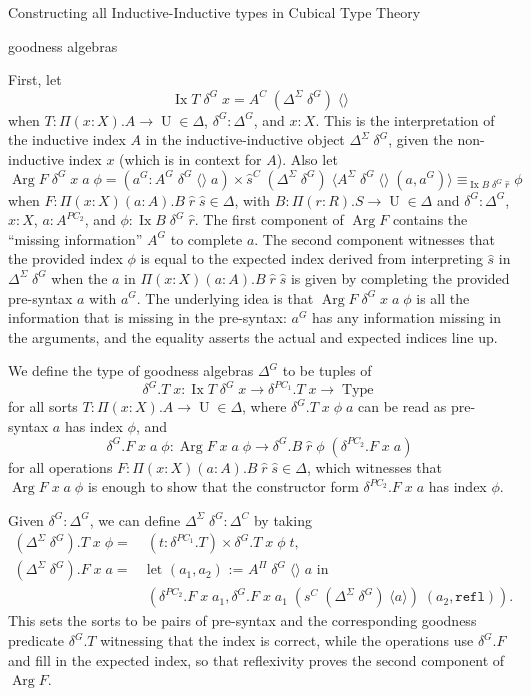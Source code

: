 \documentclass[runningheads]{llncs}
\DeclareMathOperator{\USet}{Type}
\DeclareMathOperator{\UU}{U}
\DeclareMathOperator{\Arg}{Arg}
\DeclareMathOperator{\Ix}{Ix}
\newcommand{\IdA}[3]{{#1}\equiv_{#3}{#2}}
\newcommand{\refl}{\texttt{refl}}
\def\emptytuple{\langle\rangle}
\begin{document}
{\begin{section}{Constructing all Inductive-Inductive types in Cubical Type Theory}
\begin{subsection}{goodness algebras}
\begin{definition}
First, let \[\Ix T\;\delta^G\;x = A^C\;(\Delta^{\Sigma}\;\delta^G)\;\emptytuple\] when $T : \Pi(x : X).A \to \UU \in \Delta$, $\delta^G : \Delta^G$, and $x : X$. This is the interpretation of the inductive index $A$ in the inductive-inductive object $\Delta^\Sigma\;\delta^G$, given the non-inductive index $x$ (which is in context for $A$).
Also let \[\Arg F\;\delta^G\;x\;a\;\phi = (a^G : A^G\;\delta^G\;\emptytuple\;a)\times\IdA{\hat{s}^C\;(\Delta^{\Sigma}\;\delta^G)\;\langle A^{\Sigma}\;\delta^G\;\emptytuple\;(a,a^G)\rangle}{\phi}{\Ix B\;\delta^G\;\hat{r}}\] when $F : \Pi(x : X)(a:A).B\;\hat{r}\;\hat{s} \in \Delta$, with $B : \Pi(r : R).S\to\UU\in\Delta$ and $\delta^G : \Delta^G$, $x : X$, $a : A^{PC_2}$, and $\phi : \Ix B\;\delta^G\;\hat{r}$. The first component of $\Arg F$ contains the ``missing information'' $A^G$ to complete $a$. The second component witnesses that the provided index $\phi$ is equal to the expected index derived from interpreting $\hat{s}$ in $\Delta^\Sigma\;\delta^G$ when the $a$ in $\Pi(x : X)(a : A).B\;\hat{r}\;\hat{s}$ is given by completing the provided pre-syntax $a$ with $a^G$. The underlying idea is that $\Arg F\;\delta^G\;x\;a\;\phi$ is all the information that is missing in the pre-syntax: $a^G$ has any information missing in the arguments, and the equality asserts the actual and expected indices line up.

We define the type of goodness algebras $\Delta^G$ to be tuples of \[\delta^G.T\;x : \Ix T\;\delta^G\;x \to \delta^{PC_1}.T\;x \to \USet\] for all sorts $T : \Pi(x : X).A \to \UU \in \Delta$, where $\delta^G.T\;x\;\phi\;a$ can be read as pre-syntax $a$ has index $\phi$, and
\[\delta^G.F\;x\;a\;\phi : \Arg F\;x\;a\;\phi \to \delta^G.B\;\hat{r}\;\phi\;(\delta^{PC_2}.F\;x\;a)\] for all operations $F : \Pi(x : X)(a : A).B\;\hat{r}\;\hat{s} \in \Delta$, which witnesses that $\Arg F\;x\;a\;\phi$ is enough to show that the constructor form $\delta^{PC_2}.F\;x\;a$ has index $\phi$.

Given $\delta^G : \Delta^G$, we can define $\Delta^\Sigma\;\delta^G : \Delta^C$ by taking \begin{align*}(\Delta^\Sigma\;\delta^G).T\;x\;\phi =&\; (t : \delta^{PC_1}.T)\times \delta^G.T\;x\;\phi\;t,\\
(\Delta^\Sigma\;\delta^G).F\;x\;a =&\; \text{let $(a_1,a_2)$ := $A^{\Pi}\;\delta^G\;\emptytuple\;a$ in}\\&\;(\delta^{PC_2}.F\;x\;a_1, \delta^G.F\;x\;a_1\;(s^C\;(\Delta^\Sigma\;\delta^G)\;\langle a\rangle)\;(a_2,\refl)).\end{align*}
This sets the sorts to be pairs of pre-syntax and the corresponding goodness predicate $\delta^G.T$ witnessing that the index is correct, while the operations use $\delta^G.F$ and fill in the expected index, so that reflexivity proves the second component of $\Arg F$.


\end{definition}
\end{subsection}
\end{section}}
\end{document}
